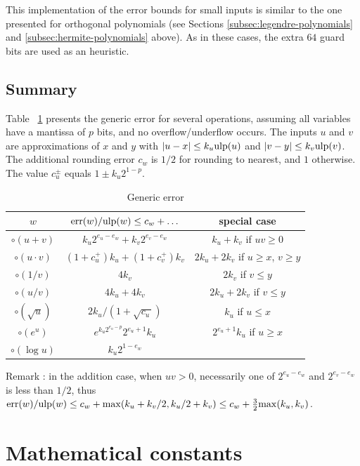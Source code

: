 \documentclass[12pt]{amsart}
\def\ulp{{\rm ulp}}
\def\err{{\rm err}}
\begin{document}
This implementation of the error bounds for small inputs is similar to the one
presented for orthogonal polynomials (see Sections
\ref{subsec:legendre-polynomials} and \ref{subsec:hermite-polynomials}
above). As in these cases, the extra $64$ guard bits are used as an heuristic.

\subsection{Summary}

Table ~\ref{table:genericError} presents the generic error for several operations, assuming all variables have a
mantissa of $p$ bits, and no overflow/underflow occurs.
The inputs $u$ and $v$ are
approximations of $x$ and $y$ with $|u-x| \le k_u \ulp(u)$ and
$|v-y| \le k_v \ulp(v)$. The additional rounding error $c_w$ is $1/2$ for
rounding to nearest, and $1$ otherwise.
The value $c^{\pm}_u$ equals $1 \pm k_u 2^{1-p}$.

\begin{table}[ht]
\begin{center}
\begin{tabular}{|c|c|c|} \hline
   $w$        & $\err(w)/\ulp(w) \le c_w + \ldots$ &special case\\ \hline\hline
$\circ(u+v)$ & $k_u 2^{e_u-e_w} + k_v 2^{e_v-e_w}$ & $k_u + k_v$ if $u v \ge 0$\\
$\circ(u \cdot v)$ & $(1+c^{+}_u)k_u + (1+c^{+}_v)k_v$ & $2k_u + 2k_v$ if $u \ge x$, $v \ge y$\\
$\circ(1/v)$ & $4 k_v$ & $2 k_v$ if $v \le y$ \\
$\circ(u/v)$ & $4 k_u + 4 k_v$ & $2 k_u + 2 k_v$ if $v \le y$ \\
$\circ(\sqrt{u})$ & $2 k_u/(1+\sqrt{c^{-}_u})$ & $k_u$ if $u \le x$ \\
$\circ(e^u)$ & $e^{k_u 2^{e_u-p}} 2^{e_u+1} k_u$ & $2^{e_u+1} k_u$ if $u \ge x$ \\
$\circ(\log u)$ & $k_u 2^{1-e_w}$ & \\
\hline
\end{tabular}
\end{center}
\caption{Generic error}
\label{table:genericError}
\end{table}
Remark : in the addition case, when $u v > 0$,
necessarily one of $2^{e_u-e_w}$ and $2^{e_v-e_w}$ is less than $1/2$,
thus $\err(w)/\ulp(w) \le c_w + {\rm max}(k_u + k_v/2, k_u/2 + k_v)
        \le c_w + \frac{3}{2} {\rm max}(k_u, k_v)$.

\section{Mathematical constants}
\end{document}
